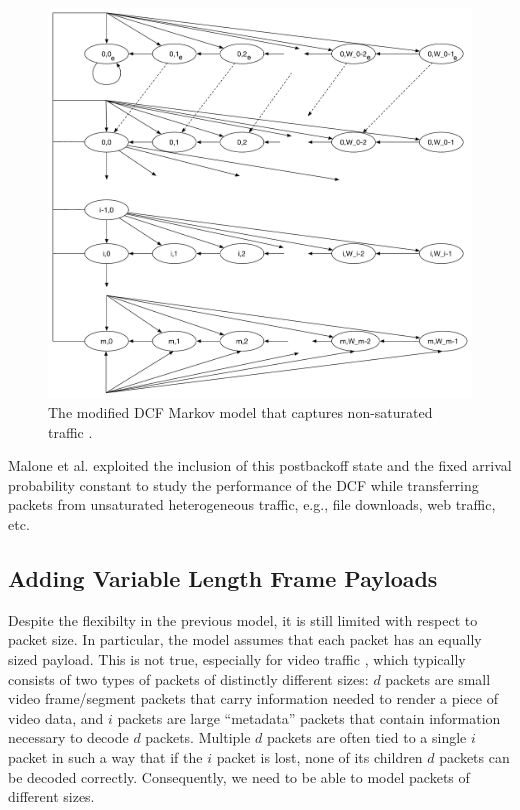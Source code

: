 \documentclass{llncs}
\begin{document}
\begin{figure}
\begin{center}
\includegraphics[scale=0.5]{../../sketches/dcf_model_nonsaturated.pdf}
\caption{The modified DCF Markov model that captures non-saturated traffic \cite{dcf-unsaturated}.}
\label{fig:dcf_model_nonsaturated}
\end{center}
\end{figure}

Malone et al. \cite{dcf-nonsaturated} exploited the inclusion of this postbackoff state and the fixed arrival probability constant to study the performance of the DCF while transferring packets from unsaturated heterogeneous traffic, e.g., file downloads, web traffic, etc.

\subsection{Adding Variable Length Frame Payloads}
Despite the flexibilty in the previous model, it is still limited with respect to packet size. In particular, the model assumes that each packet has an equally sized payload. This is not true, especially for video traffic \cite{???}, which typically consists of two types of packets of distinctly different sizes: $d$ packets are small video frame/segment packets that carry information needed to render a piece of video data, and $i$ packets are large ``metadata'' packets that contain information necessary to decode $d$ packets. Multiple $d$ packets are often tied to a single $i$ packet in such a way that if the $i$ packet is lost, none of its children $d$ packets can be decoded correctly. Consequently, we need to be able to model packets of different sizes. 
\end{document}
